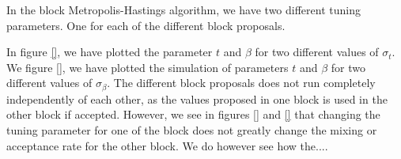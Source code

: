 In the block Metropolis-Hastings algorithm, we have two different tuning parameters. One for each of the different block proposals. 


 In figure \ref{}, we have plotted the parameter $t$ and $\beta$ for two different values of $\sigma_t$. We figure \ref{}, we have plotted the simulation of parameters $t$ and $\beta$ for two different values of $\sigma_{\beta}$. The different block proposals does not run completely independently of each other, as the values proposed in one block is used in the other block if accepted. However, we see in figures \ref{} and \ref{} that changing the tuning parameter for one of the block does not greatly change the mixing or acceptance rate for the other block. We do however see how the.... 
